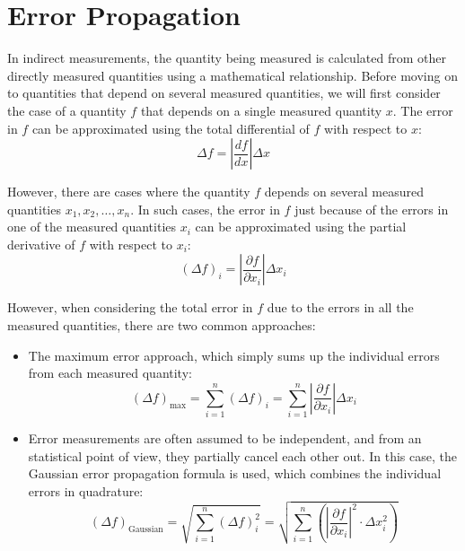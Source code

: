 \section{Error Propagation}

In indirect measurements, the quantity being measured is calculated from other directly measured quantities using a mathematical relationship. Before moving on to quantities that depend on several measured quantities, we will first consider the case of a quantity $f$ that depends on a single measured quantity $x$. The error in $f$ can be approximated using the total differential of $f$ with respect to $x$:
\begin{equation*}
    \Delta f = \left| \dfrac{df}{dx} \right| \Delta x
\end{equation*}

However, there are cases where the quantity $f$ depends on several measured quantities $x_1, x_2, \ldots, x_n$. In such cases, the error in $f$ just because of the errors in one of the measured quantities $x_i$ can be approximated using the partial derivative of $f$ with respect to $x_i$:
\begin{equation*}
    (\Delta f)_i = \left| \dfrac{\partial f}{\partial x_i} \right| \Delta x_i
\end{equation*}

However, when considering the total error in $f$ due to the errors in all the measured quantities, there are two common approaches:
\begin{itemize}
    \item The maximum error approach, which simply sums up the individual errors from each measured quantity:
    \begin{equation*}
        (\Delta f)_{\max} = \sum_{i=1}^n (\Delta f)_i = \sum_{i=1}^n \left| \dfrac{\partial f}{\partial x_i} \right| \Delta x_i
    \end{equation*}
    \item Error measurements are often assumed to be independent, and from an statistical point of view, they partially cancel each other out. In this case, the Gaussian error propagation formula is used, which combines the individual errors in quadrature:
    \begin{equation*}
        (\Delta f)_{\text{Gaussian}} = \sqrt{\sum_{i=1}^n \left(\Delta f\right)_i^2} = \sqrt{\sum_{i=1}^n \left( \left| \dfrac{\partial f}{\partial x_i} \right|^2\cdot \Delta x_i^2 \right)}
    \end{equation*}
\end{itemize}

